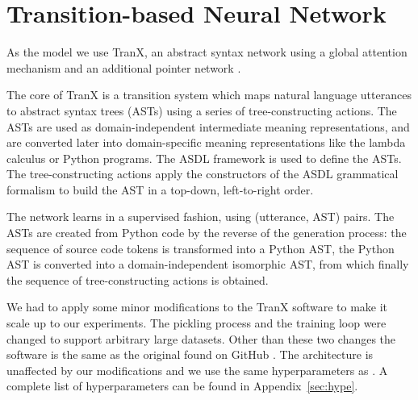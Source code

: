 \section{Transition-based Neural Network}

As the model we use TranX\cite{tranx}, an abstract syntax network
\cite{abstractNetworks} using a global attention mechanism \cite{translation,
  LuongPhamManning2015} and an additional pointer network
\cite{VinyalsFortunatoJaitly2015}.

The core of TranX is a transition system which maps natural language utterances
to abstract syntax trees (ASTs) using a series of tree-constructing actions. The
ASTs are used as domain-independent intermediate meaning representations, and
are converted later into domain-specific meaning representations like the lambda
calculus or Python programs. The ASDL framework \cite{asdl} is used to define
the ASTs. The tree-constructing actions apply the constructors of the ASDL
grammatical formalism to build the AST in a top-down, left-to-right order.

The network learns in a supervised fashion, using (utterance, AST) pairs. The
ASTs are created from Python code by the reverse of the generation process: the
sequence of source code tokens is transformed into a Python AST, the Python AST
is converted into a domain-independent isomorphic AST, from which finally the
sequence of tree-constructing actions is obtained.

We had to apply some minor modifications to the TranX software \cite{tranxRepo}
to make it scale up to our experiments. The pickling\cite{oliphant2007python}
process and the training loop were changed to support arbitrary large datasets.
Other than these two changes the software is the same as the original found on
GitHub \cite{tranxRepo}. The architecture is unaffected by our modifications and
we use the same hyperparameters as \cite{tranx}. A complete list of
hyperparameters can be found in Appendix~\ref{sec:hype}.